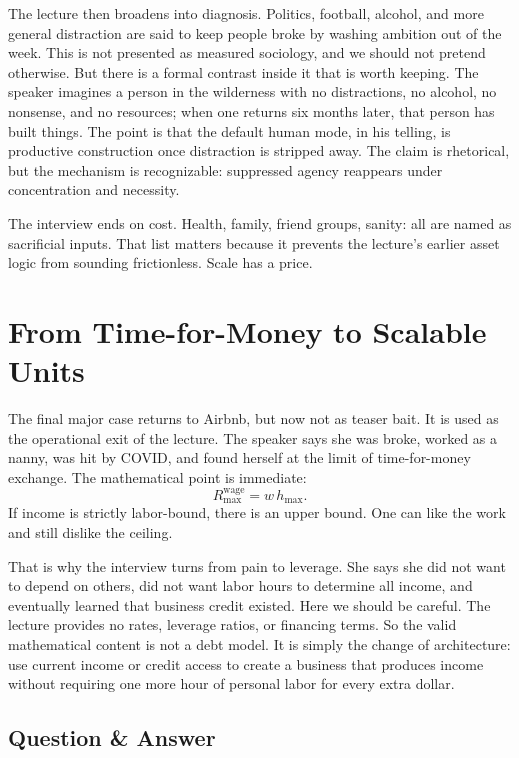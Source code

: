 The lecture then broadens into diagnosis. Politics, football, alcohol, and more general distraction are said to keep people broke by washing ambition out of the week. This is not presented as measured sociology, and we should not pretend otherwise. But there is a formal contrast inside it that is worth keeping. The speaker imagines a person in the wilderness with no distractions, no alcohol, no nonsense, and no resources; when one returns six months later, that person has built things. The point is that the default human mode, in his telling, is productive construction once distraction is stripped away. The claim is rhetorical, but the mechanism is recognizable: suppressed agency reappears under concentration and necessity.

The interview ends on cost. Health, family, friend groups, sanity: all are named as sacrificial inputs. That list matters because it prevents the lecture's earlier asset logic from sounding frictionless. Scale has a price.

\section{From Time-for-Money to Scalable Units}

The final major case returns to Airbnb, but now not as teaser bait. It is used as the operational exit of the lecture. The speaker says she was broke, worked as a nanny, was hit by COVID, and found herself at the limit of time-for-money exchange. The mathematical point is immediate:
\begin{equation}
R_{\max}^{\mathrm{wage}} = w\,h_{\max}.
\end{equation}
If income is strictly labor-bound, there is an upper bound. One can like the work and still dislike the ceiling.

That is why the interview turns from pain to leverage. She says she did not want to depend on others, did not want labor hours to determine all income, and eventually learned that business credit existed. Here we should be careful. The lecture provides no rates, leverage ratios, or financing terms. So the valid mathematical content is not a debt model. It is simply the change of architecture: use current income or credit access to create a business that produces income without requiring one more hour of personal labor for every extra dollar.

\subsection{Question \& Answer}

